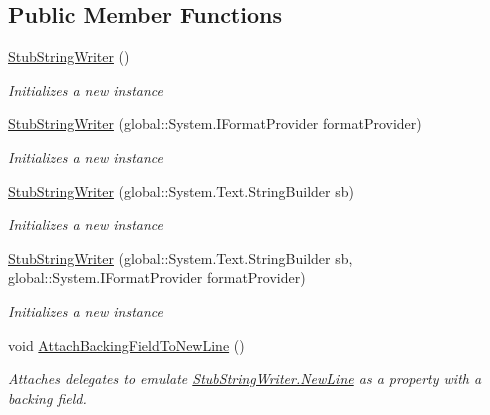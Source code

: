 \subsection*{Public Member Functions}
\begin{DoxyCompactItemize}
\item 
\hyperlink{class_system_1_1_i_o_1_1_fakes_1_1_stub_string_writer_aad934e97810a8029c75528d886d22923}{Stub\-String\-Writer} ()
\begin{DoxyCompactList}\small\item\em Initializes a new instance\end{DoxyCompactList}\item 
\hyperlink{class_system_1_1_i_o_1_1_fakes_1_1_stub_string_writer_a51b72d37346540ef677316ec37a03dc5}{Stub\-String\-Writer} (global\-::\-System.\-I\-Format\-Provider format\-Provider)
\begin{DoxyCompactList}\small\item\em Initializes a new instance\end{DoxyCompactList}\item 
\hyperlink{class_system_1_1_i_o_1_1_fakes_1_1_stub_string_writer_a110ed527af5bf60e898cc244730a7871}{Stub\-String\-Writer} (global\-::\-System.\-Text.\-String\-Builder sb)
\begin{DoxyCompactList}\small\item\em Initializes a new instance\end{DoxyCompactList}\item 
\hyperlink{class_system_1_1_i_o_1_1_fakes_1_1_stub_string_writer_a47ae99aa83870ebcb37a2cd093f465ea}{Stub\-String\-Writer} (global\-::\-System.\-Text.\-String\-Builder sb, global\-::\-System.\-I\-Format\-Provider format\-Provider)
\begin{DoxyCompactList}\small\item\em Initializes a new instance\end{DoxyCompactList}\item 
void \hyperlink{class_system_1_1_i_o_1_1_fakes_1_1_stub_string_writer_ad815227e05cde7e58087cd9580057f0c}{Attach\-Backing\-Field\-To\-New\-Line} ()
\begin{DoxyCompactList}\small\item\em Attaches delegates to emulate \hyperlink{class_system_1_1_i_o_1_1_fakes_1_1_stub_string_writer_ad979685926ff32c450b9a02836ec87db}{Stub\-String\-Writer.\-New\-Line} as a property with a backing field.\end{DoxyCompactList}\item 

\end{DoxyCompactItemize}
